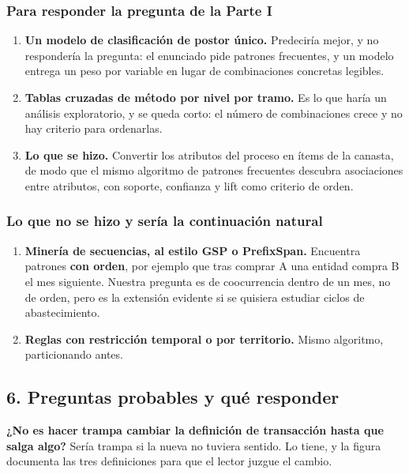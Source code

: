\documentclass[11pt]{article}
\begin{document}
\subsubsection*{Para responder la pregunta de la Parte I}
\begin{enumerate}
  \item \textbf{Un modelo de clasificación de postor único.} Predeciría mejor, y no respondería la pregunta: el enunciado pide patrones frecuentes, y un modelo entrega un peso por variable en lugar de combinaciones concretas legibles.
  \item \textbf{Tablas cruzadas de método por nivel por tramo.} Es lo que haría un análisis exploratorio, y se queda corto: el número de combinaciones crece y no hay criterio para ordenarlas.
  \item \textbf{Lo que se hizo.} Convertir los atributos del proceso en ítems de la canasta, de modo que el mismo algoritmo de patrones frecuentes descubra asociaciones entre atributos, con soporte, confianza y lift como criterio de orden.
\end{enumerate}
\subsubsection*{Lo que no se hizo y sería la continuación natural}
\begin{enumerate}
  \item \textbf{Minería de secuencias, al estilo GSP o PrefixSpan.} Encuentra patrones \textbf{con orden}, por ejemplo que tras comprar A una entidad compra B el mes siguiente. Nuestra pregunta es de coocurrencia dentro de un mes, no de orden, pero es la extensión evidente si se quisiera estudiar ciclos de abastecimiento.
  \item \textbf{Reglas con restricción temporal o por territorio.} Mismo algoritmo, particionando antes.
\end{enumerate}
\subsection*{6. Preguntas probables y qué responder}
\textbf{¿No es hacer trampa cambiar la definición de transacción hasta que salga algo?} Sería trampa si la nueva no tuviera sentido. Lo tiene, y la figura documenta las tres definiciones para que el lector juzgue el cambio.
\end{document}
